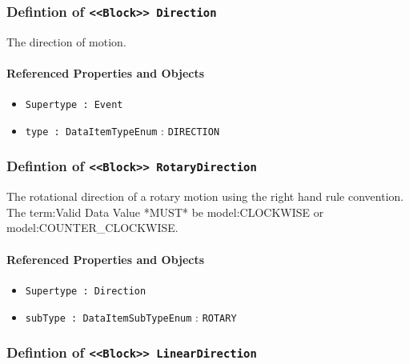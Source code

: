\subsubsection{Defintion of \texttt{<<Block>> Direction}}
  \label{type:Direction}

\FloatBarrier

The direction of motion.

\FloatBarrier
\paragraph{Referenced Properties and Objects}

\begin{itemize}
\item \texttt{Supertype : Event}

\item \texttt{type : DataItemTypeEnum} : \texttt{DIRECTION}

\end{itemize}
\FloatBarrier
\subsubsection{Defintion of \texttt{<<Block>> RotaryDirection}}
  \label{type:RotaryDirection}

\FloatBarrier

The rotational direction of a rotary motion using the right hand rule convention.
 The {term:Valid Data Value} *MUST* be {model:CLOCKWISE} or {model:COUNTER_CLOCKWISE}.

\FloatBarrier
\paragraph{Referenced Properties and Objects}

\begin{itemize}
\item \texttt{Supertype : Direction}

\item \texttt{subType : DataItemSubTypeEnum} : \texttt{ROTARY}

\end{itemize}
\FloatBarrier
\subsubsection{Defintion of \texttt{<<Block>> LinearDirection}}
  \label{type:LinearDirection}

\FloatBarrier

